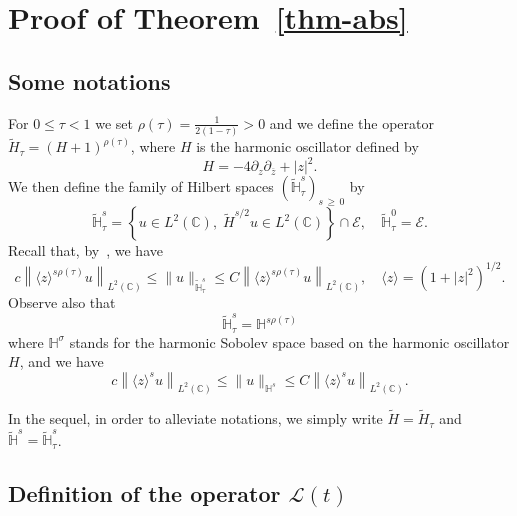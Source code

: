 \documentclass[10pt]{amsart}
\theoremstyle{definition}\newtheorem{defi}[theo]{Definition}\newtheorem{rema}[theo]{Remark}\newtheorem{exam}[theo]{Example}\newtheorem{exem}[theo]{Example}\newtheorem{nota}[theo]{Notation}
\newcommand{\C}{\mathbb{C}}
\newcommand{\HH}{\mathbb{H}}
\newcommand{\E}{\mathcal{E}}
\renewcommand{\L}{\mathscr{L}}
\newcommand{\ov}{\overline}
\newcommand{\wt}{\widetilde}
\newcommand{\<}{\langle}
\renewcommand{\>}{\rangle}
\begin{document}
\section{Proof of Theorem~\ref{thm-abs}} \label{Sect4}


\subsection{Some notations}

For $0\leq \tau <1$ we set $\rho(\tau)=\frac1{2(1-\tau)}>0$ and we define the operator $\wt{H}_\tau=(H+1)^{\rho(\tau)}$, where $H$ is the harmonic oscillator defined by
\[
H = -4\partial_z \partial_{\ov z}+|z|^2.
\]
We then define the family of Hilbert spaces $(\widetilde{\HH}_\tau^{s})_{s\,\geq\,0}$ by
\[
\widetilde{\HH}_\tau^{s} = \left\{ u\in L^2(\C),\; \wt{H}^{s/2}u\in L^2(\C)\right\} \cap \E,\quad \widetilde{\HH}_\tau^{0} =\E.
\]
Recall that, by~\cite[Lemma~C.1]{GGT}, we have
\[
c \left\|\<z\>^{s\rho(\tau)} u\right\|_{L^2(\C)} \leq \|u\|_{\wt{\HH}_\tau^s} \leq C\left\|\<z\>^{s\rho(\tau)} u\right\|_{L^2(\C)}, \quad \<z\>=\left(1+|z|^2\right)^{1/2}.
\]
Observe also that
\begin{equation}\label{eq-hs}
\widetilde{\HH}_\tau^{s} = {\HH}^{s \rho(\tau)}
\end{equation}
where ${\HH}^{\sigma}$ stands for the harmonic Sobolev space based on the harmonic oscillator $H$, and we have
\begin{equation}\label{eq-hs1}
c\left\|\<z\>^{s} u\right\|_{L^2(\C)} \leq \|u\|_{{\HH}^s} \leq C\left\|\<z\>^{s} u\right\|_{L^2(\C)}.
\end{equation}

In the sequel, in order to alleviate notations, we simply write $\wt{H}=
\wt{H}_\tau$ and $\widetilde{\HH}^{s} = \widetilde{\HH}_\tau^{s}$.


\subsection{Definition of the operator \texorpdfstring{$ \L(t)$}{mathscrL(t)}}
\end{document}
